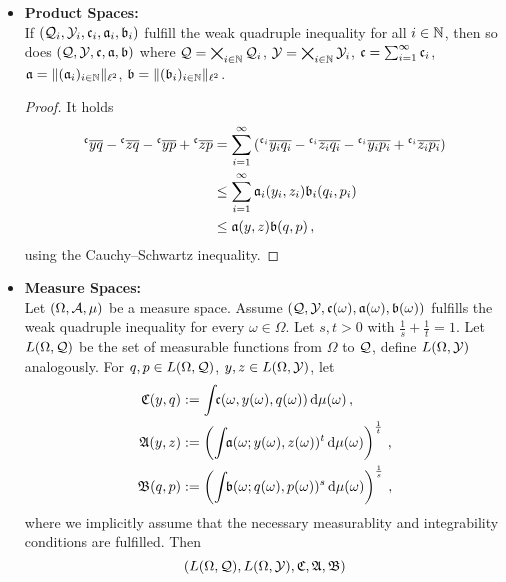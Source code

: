 \begin{itemize}
\item[] \hspace*{-0.5cm}\textbf{Product Spaces:}\\
	If $(\mathcal{Q}_i, \mathcal{Y}_i, \mathfrak{c}_i, \mathfrak{a}_i, \mathfrak{b}_i)$ fulfill the weak quadruple inequality for all $i \in \mathbb{N}$, then so does
	$(\mathcal{Q}, \mathcal{Y}, \mathfrak{c}, \mathfrak{a}, \mathfrak{b})$ where $\mathcal{Q} = \bigtimes_{i\in \mathbb{N}} \mathcal{Q}_i$, $\mathcal{Y} = \bigtimes_{i\in \mathbb{N}} \mathcal{Y}_i$, $\mathfrak{c} = \sum_{i=1}^\infty \mathfrak{c}_i$, $\mathfrak{a} = \Vert (\mathfrak{a}_i)_{i\in\mathbb{N}} \Vert_{\ell^2}$, $\mathfrak{b} = \Vert (\mathfrak{b}_i)_{i\in\mathbb{N}} \Vert_{\ell^2}$.	
	\begin{proof}
		It holds
		\begin{align*}
			\olc yq- \olc zq -\olc yp+\olc zp 
			&= 
			\sum_{i=1}^\infty \br{
			\leftidx{^{\mf c_i}}{\ol {y_i}{q_i}}
			- \leftidx{^{\mf c_i}}{\ol {z_i}{q_i}} 
			- \leftidx{^{\mf c_i}}{\ol {y_i}{p_i}}
			+\leftidx{^{\mf c_i}}{\ol {z_i}{p_i}}}
			\\&\leq 
			\sum_{i=1}^\infty \mf a_i(y_i, z_i) \mf b_i(q_i, p_i)
			\\&\leq 
			 \mf a(y,z) \mf b(q,p)
			\eqcm
		\end{align*}
		using the Cauchy--Schwartz inequality.
	\end{proof}
\item[] \hspace*{-0.5cm}\textbf{Measure Spaces:}\\
	Let $(\Omega, \mathcal{A}, \mu)$ be a measure space.
	Assume $(\mathcal{Q}, \mathcal{Y}, \mathfrak{c}(\omega), \mathfrak{a}(\omega), \mathfrak{b}(\omega))$ fulfills the weak quadruple inequality for every $\omega \in \Omega$. Let $s,t>0$ with $\frac1s+\frac1t=1$. 
	Let $L(\Omega, \mathcal{Q})$ be the set of measurable functions from $\Omega$ to $\mathcal{Q}$,  define $L(\Omega, \mathcal{Y})$ analogously.
	For $q,p \in L(\Omega, \mathcal{Q})$, $y,z \in L(\Omega, \mathcal{Y})$, let
	\begin{align*}
		\mathfrak{C}(y, q) &:= \int\!\! \mathfrak{c}(\omega, y(\omega), q(\omega)) \, \mathrm{d} \mu(\omega) \, ,\\
		\mathfrak{A}(y, z) &:= \left( \int\!\! \mathfrak{a}(\omega; y(\omega),z(\omega))^t \, \mathrm{d} \mu(\omega) \right)^{\frac1t} \, , \\
		\mathfrak{B}(q, p) &:= \left( \int\!\! \mathfrak{b}(\omega; q(\omega),p(\omega))^s \, \mathrm{d} \mu(\omega) \right)^{\frac1s}
		\, ,
	\end{align*}
	where we implicitly assume that the necessary measurablity and integrability conditions are fulfilled. Then
	\begin{equation*}
		\br{L(\Omega, \mc Q), L(\Omega, \mc Y), \mf C, \mf A, \mf B}

\end{equation*}
\end{itemize}

